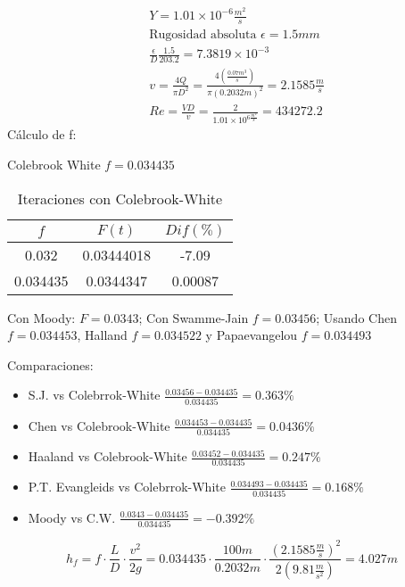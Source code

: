 \begin{align*}
    &Y = 1.01 \times 10^{ - 6} \frac{m^2}{s}\\
    &\text{Rugosidad absoluta }\epsilon = 1.5mm\\
    &\frac{\epsilon}{D} \frac{1.5}{203.2} =7.3819 \times 10^{ -3}\\
    &v = \frac{4Q}{\pi D^2} = \frac{4\left(\frac{0.07m^3}{s}\right)}{\pi\left(0.2032m\right)^2} = 2.1585 \frac{m}{s}\\
    &Re = \frac{VD}{v} = \frac{2}{1.01 \times 10^{ 6 \frac{m^2}{s}}} = 434272.2
\end{align*}
Cálculo de f:

Colebrook White $f=0.034435$

\begin{table}[h!]
    \centering
    \begin{tabular}{@{}ccc@{}}
    \toprule
    $f$      & $F(t)$     & $Dif(\%)$ \\ \midrule
    0.032    & 0.03444018 & -7.09     \\
    0.034435 & 0.0344347  & 0.00087   \\ \bottomrule
    \end{tabular}
    \caption{Iteraciones con Colebrook-White}
    \label{tabhb14}
    \end{table}
Con Moody: $F=0.0343$; Con Swamme-Jain $f=0.03456$; Usando Chen $f=0.034453$, Halland $f=0.034522$ y Papaevangelou $f=0.034493$

Comparaciones:
\begin{itemize}
    \item S.J. vs Colebrrok-White $\frac{0.03456-0.034435}{0.034435}=0.363\%$
    \item Chen vs Colebrook-White $\frac{0.034453-0.034435}{0.034435}=0.0436\%$
    \item Haaland vs Colebrook-White $\frac{0.03452-0.034435}{0.034435}=0.247\%$
    \item P.T. Evangleids vs Colebrrok-White $\frac{0.034493-0.034435}{0.034435}=0.168\%$
    \item Moody vs C.W. $\frac{0.0343-0.034435}{0.034435}=-0.392\%$
\end{itemize}

\begin{equation*}
    h_f = f\cdot \frac{L}{D}\cdot \frac{v^2}{2g} =0.034435\cdot \frac{100m}{0.2032m}\cdot \frac{\left(2.1585 \frac{m}{s}\right)^2}{2\left(9.81\frac{m}{s^2}\right)} = 4.027m
\end{equation*}

